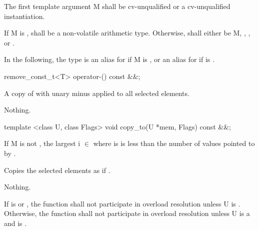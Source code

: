 \pnum The first template argument \type M shall be cv-unqualified \bool or a cv-unqualified \mask instantiation.

\pnum
If \type M is \bool,  shall be a non-volatile arithmetic type.
Otherwise,  shall either be \type M, , , or .

\pnum In the following, the type  is an alias for  if \type M is \bool, or an alias for  if  is \true.

\pnum{}

\begin{itemdecl}
remove_const_t<T> operator-() const &&;
\end{itemdecl}
\begin{itemdescr}
  \pnum\returns A copy of  with unary minus applied to all selected elements.

  \pnum\throws Nothing.
\end{itemdescr}

\begin{itemdecl}
template <class U, class Flags> void copy_to(U *mem, Flags) const &&;
\end{itemdecl}
\begin{itemdescr}
   If \type M is not \bool, the largest i $\in$ \code{[0, M::size())} where  is \true is less than the number of values pointed to by .

  \pnum\effects Copies the selected elements as if  .

  \pnum\throws Nothing.

  \pnum\remarks If  is \bool or , the function shall not participate in overload resolution unless \type U is \bool.
  Otherwise, the function shall not participate in overload resolution unless \type U is a \realArithmeticType and  is \true.
\end{itemdescr}

